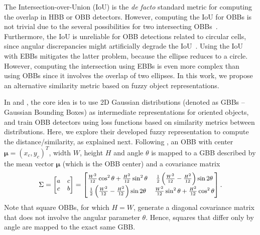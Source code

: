 \documentclass{article}
\begin{document}
The Intersection-over-Union (IoU) is the \textit{de facto} standard metric for computing the overlap in HBB or OBB detectors. However, computing the IoU for OBBs is not trivial due to the several possibilities for two intersecting OBBs~\cite{chen2020piou}. Furthermore, the IoU is unreliable for OBB detections related to circular cells, since angular discrepancies might artificially degrade the IoU~\cite{Murrugarra-Llerena_2022_CVPR}. Using the IoU with EBBs mitigates the latter problem, because the ellipse reduces to a circle. However, computing the intersection using EBBs is even more complex than using OBBs since it involves the overlap of two ellipses. In this work, we propose an alternative similarity metric based on fuzzy object representations.

In \cite{gwd,kld} and \cite{probiou}, the core idea is to use 2D Gaussian distributions (denoted as GBBs -- Gaussian Bounding Boxes) as intermediate representations for oriented objects, and train OBB detectors using loss functions based on similarity metrics between distributions. Here, we explore their developed fuzzy representation to compute the distance/similarity, as explained next. Following \cite{probiou}, an OBB with center $\bm{\mu} = (x_c, y_c)^T$, width $W$, height $H$ and angle $\theta$ is mapped to a GBB described by the mean vector $\bm{\mu}$ (which is the OBB center) and a covariance matrix \begin{equation}
\small
    \Sigma =
    \begin{bmatrix}a & c \\
    c  & b\end{bmatrix}
    = 
    \begin{bmatrix}\frac{W^2}{12} \cos^{2}\theta + \frac{H^2}{12} \sin^{2}\theta & \frac{1}{2}\left(\frac{W^2}{12} - \frac{H^2}{12}\right) \sin2 \theta \\
    \frac{1}{2}\left(\frac{W^2}{12} - \frac{H^2}{12}\right) \sin2 \theta  & \frac{W^2}{12} \sin^{2}\theta  + \frac{H^2}{12} \cos^{2}\theta\end{bmatrix}.
\end{equation}
Note that square OBBs, for which $H=W$, generate a diagonal covariance matrix that does not involve the angular parameter $\theta$. Hence, squares that differ only by angle are mapped to the exact same GBB.
\end{document}
